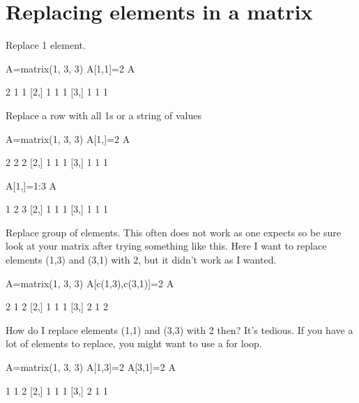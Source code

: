 \section{Replacing elements in a matrix}
Replace 1 element.
\begin{Schunk}
\begin{Sinput}
 A=matrix(1, 3, 3)
 A[1,1]=2
 A
\end{Sinput}
\begin{Soutput}
     [,1] [,2] [,3]
[1,]    2    1    1
[2,]    1    1    1
[3,]    1    1    1
\end{Soutput}
\end{Schunk}
Replace a row with all 1s or a string of values
\begin{Schunk}
\begin{Sinput}
 A=matrix(1, 3, 3)
 A[1,]=2
 A
\end{Sinput}
\begin{Soutput}
     [,1] [,2] [,3]
[1,]    2    2    2
[2,]    1    1    1
[3,]    1    1    1
\end{Soutput}
\begin{Sinput}
 A[1,]=1:3
 A
\end{Sinput}
\begin{Soutput}
     [,1] [,2] [,3]
[1,]    1    2    3
[2,]    1    1    1
[3,]    1    1    1
\end{Soutput}
\end{Schunk}
Replace group of elements.  This often does not work as one expects so be sure look at your matrix after trying something like this.  Here I want to replace elements (1,3) and (3,1) with 2, but it didn't work as I wanted.
\begin{Schunk}
\begin{Sinput}
 A=matrix(1, 3, 3)
 A[c(1,3),c(3,1)]=2
 A
\end{Sinput}
\begin{Soutput}
     [,1] [,2] [,3]
[1,]    2    1    2
[2,]    1    1    1
[3,]    2    1    2
\end{Soutput}
\end{Schunk}
How do I replace elements (1,1) and (3,3) with 2 then?  It's tedious.  If you have a lot of elements to replace, you might want to use a for loop.
\begin{Schunk}
\begin{Sinput}
 A=matrix(1, 3, 3)
 A[1,3]=2
 A[3,1]=2
 A
\end{Sinput}
\begin{Soutput}
     [,1] [,2] [,3]
[1,]    1    1    2
[2,]    1    1    1
[3,]    2    1    1
\end{Soutput}
\end{Schunk}

